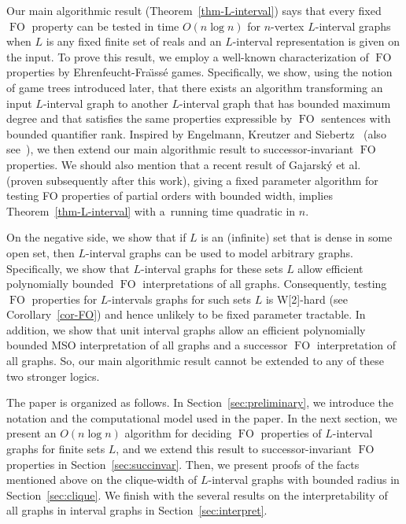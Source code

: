\documentclass{CSML}
\newcommand{\FO}{\ensuremath{\operatorname{FO}}\xspace}
\theoremstyle{plain}\newtheorem{claim}[thm]{Claim}
\begin{document}
Our main algorithmic result (Theorem~\ref{thm-L-interval}) says that
every fixed \FO property can be tested
in time $O(n\log n)$ for $n$-vertex $L$-interval graphs when 
$L$ is any fixed finite set of reals and an $L$-interval representation is
given on the input.
To prove this result, we employ a well-known characterization of \FO properties
by Ehrenfeucht-Fra{\"\i}ss\'e games. Specifically,
we show, using the notion of game trees introduced later, that
there exists an algorithm transforming an input $L$-interval graph to another $L$-interval
graph that has bounded maximum degree and that satisfies the same properties expressible
by \FO sentences with bounded quantifier rank.
Inspired by Engelmann, Kreutzer and Siebertz~\cite{EKS12} (also see~\cite{EKK13}),
we then extend our main algorithmic result to successor-invariant
\FO properties.
We should also mention that a recent result of Gajarsk\'y et 
al.~\cite{gajetal15} (proven subsequently after this work),
giving a fixed parameter algorithm for testing
FO properties of partial orders with bounded width, implies
Theorem~\ref{thm-L-interval} with a~running time quadratic in $n$.

On the negative side, we show that if $L$ is an (infinite) set that is dense
in some open set, then $L$-interval graphs can be used to model arbitrary graphs.
Specifically, we show that $L$-interval graphs for these sets $L$ allow
efficient polynomially bounded \FO interpretations of all graphs. Consequently,
testing \FO properties for $L$-intervals graphs for such sets $L$ is 
W[2]-hard (see Corollary~\ref{cor-FO}) and hence unlikely to be fixed parameter tractable.
In addition, we show that unit interval graphs allow an efficient polynomially bounded
MSO interpretation of all graphs and a successor \FO interpretation of all graphs.
So, our main algorithmic result cannot be extended to any of these two stronger logics.

The paper is organized as follows.
In Section~\ref{sec:preliminary}, we introduce the notation and the computational
model used in the paper. In the next section, we present an $O(n\log n)$
algorithm for deciding \FO properties of $L$-interval graphs for finite sets $L$,
and we extend this result to successor-invariant \FO properties
in Section~\ref{sec:succinvar}.
Then, we present proofs of the facts mentioned above
on the clique-width of $L$-interval graphs with bounded radius in Section~\ref{sec:clique}.
We finish with the several results on the interpretability of all graphs in interval graphs in Section~\ref{sec:interpret}.
\end{document}
